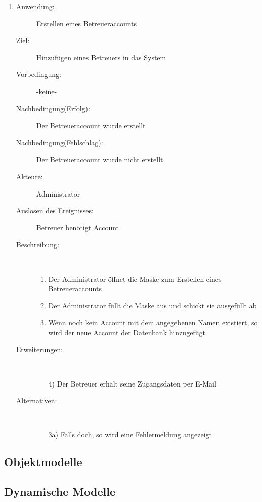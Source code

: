\documentclass[parskip=full]{scrartcl}
\newcommand{\swtLabel}[1]{\textbf{\textbackslash #1\arabic*0\textbackslash}}
\begin{document}
\begin{enumerate} [label=\swtLabel{A}]
  
  \item
  \begin{description}
  \item[Anwendung:] Erstellen eines Betreueraccounts
  \item[Ziel:] Hinzufügen eines Betreuers in das System
  	\item[Vorbedingung:] -keine-
  	\item[Nachbedingung(Erfolg):] Der Betreueraccount wurde erstellt
  	\item[Nachbedingung(Fehlschlag):] Der Betreueraccount wurde nicht erstellt
  	\item[Akteure:] Administrator
  	\item[Auslösen des Ereignisses:] Betreuer benötigt Account
  	\item[Beschreibung:]~
  	 \begin{enumerate} 
  	   \item Der Administrator öffnet die Maske zum Erstellen eines
  	   Betreueraccounts
  	   \item Der Administrator füllt die Maske aus und schickt sie ausgefüllt ab
  	   \item Wenn noch kein Account mit dem angegebenen Namen existiert, so wird
  	   der neue Account der Datenbank hinzugefügt
  	 \end{enumerate}
  	\item[Erweiterungen:]~
  	 \begin{enumerate}
  	   \item[4)] Der Betreuer erhält seine Zugangsdaten per E-Mail
  	 \end{enumerate}  
  	\item[Alternativen:] ~
  	 \begin{enumerate}
  	  \item[3a)] Falls doch, so wird eine Fehlermeldung angezeigt
  	 \end{enumerate}  
  \end{description}
  
\end{enumerate}  
\subsection{Objektmodelle}

\subsection{Dynamische Modelle}
\end{document}
